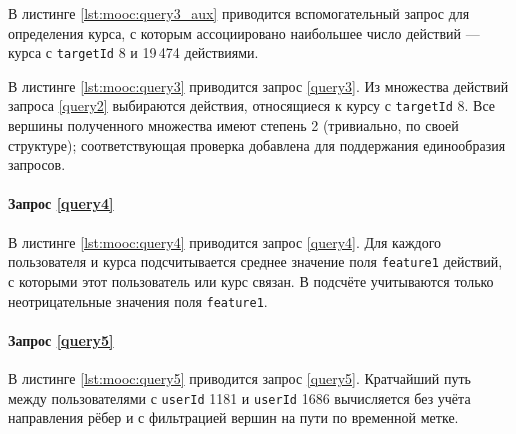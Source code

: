 В листинге \ref{lst:mooc:query3_aux} приводится вспомогательный запрос для определения курса, с которым ассоциировано
наибольшее число действий --- курса с \texttt{targetId} 8 и 19\,474 действиями.


В листинге \ref{lst:mooc:query3} приводится запрос \ref{query3}. Из множества действий запроса \ref{query2} выбираются
действия, относящиеся к курсу с \texttt{targetId} 8. Все вершины полученного множества имеют степень 2 (тривиально, по
своей структуре); соответствующая проверка добавлена для поддержания единообразия запросов.


\paragraph{Запрос \ref{query4}}

В листинге \ref{lst:mooc:query4} приводится запрос \ref{query4}. Для каждого пользователя и курса подсчитывается среднее
значение поля \texttt{feature1} действий, с которыми этот пользователь или курс связан. В подсчёте учитываются только
неотрицательные значения поля \texttt{feature1}.


\paragraph{Запрос \ref{query5}}

В листинге \ref{lst:mooc:query5} приводится запрос \ref{query5}. Кратчайший путь между пользователями с \texttt{userId}
1181 и \texttt{userId} 1686 вычисляется без учёта направления рёбер и с фильтрацией вершин на пути по временной метке.

